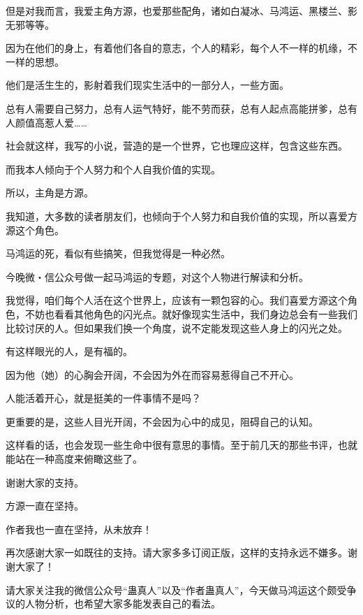 \begin{this_body}
但是对我而言，我爱主角方源，也爱那些配角，诸如白凝冰、马鸿运、黑楼兰、影无邪等等。

因为在他们的身上，有着他们各自的意志，个人的精彩，每个人不一样的机缘，不一样的思想。

他们是活生生的，影射着我们现实生活中的一部分人，一些方面。

总有人需要自己努力，总有人运气特好，能不劳而获，总有人起点高能拼爹，总有人颜值高惹人爱……

社会就这样，我写的小说，营造的是一个世界，它也理应这样，包含这些东西。

而我本人倾向于个人努力和个人自我价值的实现。

所以，主角是方源。

我知道，大多数的读者朋友们，也倾向于个人努力和自我价值的实现，所以喜爱方源这个角色。

马鸿运的死，看似有些搞笑，但我觉得是一种必然。

今晚微・信公众号做一起马鸿运的专题，对这个人物进行解读和分析。

我觉得，咱们每个人活在这个世界上，应该有一颗包容的心。我们喜爱方源这个角色，不妨也看看其他角色的闪光点。就好像现实生活中，我们身边总会有一些我们比较讨厌的人。但如果我们换一个角度，说不定能发现这些人身上的闪光之处。

有这样眼光的人，是有福的。

因为他（她）的心胸会开阔，不会因为外在而容易惹得自己不开心。

人能活着开心，就是挺美的一件事情不是吗？

更重要的是，这些人目光开阔，不会因为心中的成见，阻碍自己的认知。

这样看的话，也会发现一些生命中很有意思的事情。至于前几天的那些书评，也就能站在一种高度来俯瞰这些了。

谢谢大家的支持。

方源一直在坚持。

作者我也一直在坚持，从未放弃！

再次感谢大家一如既往的支持。请大家多多订阅正版，这样的支持永远不嫌多。谢谢大家了！

请大家关注我的微信公众号“蛊真人”以及“作者蛊真人”，今天做马鸿运这个颇受争议的人物分析，也希望大家多能发表自己的看法。

\end{this_body}

